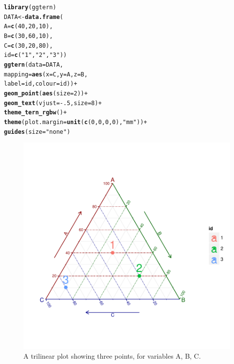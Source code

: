 \documentclass[11pt]{book}\usepackage[]{graphicx}\usepackage[]{color}
\makeatletter
\newcommand{\hlnum}[1]{\textcolor[rgb]{0.686,0.059,0.569}{#1}}%
\newcommand{\hlstr}[1]{\textcolor[rgb]{0.192,0.494,0.8}{#1}}%
\newcommand{\hlopt}[1]{\textcolor[rgb]{0,0,0}{#1}}%
\newcommand{\hlstd}[1]{\textcolor[rgb]{0.345,0.345,0.345}{#1}}%
\newcommand{\hlkwb}[1]{\textcolor[rgb]{0.69,0.353,0.396}{#1}}%
\newcommand{\hlkwc}[1]{\textcolor[rgb]{0.333,0.667,0.333}{#1}}%
\newcommand{\hlkwd}[1]{\textcolor[rgb]{0.737,0.353,0.396}{\textbf{#1}}}%
\newenvironment{kframe}{%
 \def\at@end@of@kframe{}%
 \ifinner\ifhmode%
  \def\at@end@of@kframe{\end{minipage}}%
  \begin{minipage}{\columnwidth}%
 \fi\fi%
 \def\FrameCommand##1{\hskip\@totalleftmargin \hskip-\fboxsep
 \colorbox{shadecolor}{##1}\hskip-\fboxsep
     \hskip-\linewidth \hskip-\@totalleftmargin \hskip\columnwidth}%
 \MakeFramed {\advance\hsize-\width
   \@totalleftmargin\z@ \linewidth\hsize
   \@setminipage}}%
 {\par\unskip\endMakeFramed%
 \at@end@of@kframe}
\newenvironment{knitrout}{}{} %
\renewenvironment{knitrout}{\small\renewcommand{\baselinestretch}{.85}}{} %
\makeatother
\begin{document}
\begin{knitrout}
\color{fgcolor}\begin{kframe}
\begin{alltt}
\hlkwd{library}\hlstd{(ggtern)}
\hlstd{DATA} \hlkwb{<-} \hlkwd{data.frame}\hlstd{(}
  \hlkwc{A} \hlstd{=} \hlkwd{c}\hlstd{(}\hlnum{40}\hlstd{,} \hlnum{20}\hlstd{,} \hlnum{10}\hlstd{),}
  \hlkwc{B} \hlstd{=} \hlkwd{c}\hlstd{(}\hlnum{30}\hlstd{,} \hlnum{60}\hlstd{,} \hlnum{10}\hlstd{),}
  \hlkwc{C} \hlstd{=} \hlkwd{c}\hlstd{(}\hlnum{30}\hlstd{,} \hlnum{20}\hlstd{,} \hlnum{80}\hlstd{),}
  \hlkwc{id} \hlstd{=} \hlkwd{c}\hlstd{(}\hlstr{"1"}\hlstd{,} \hlstr{"2"}\hlstd{,} \hlstr{"3"}\hlstd{))}
\hlkwd{ggtern}\hlstd{(}\hlkwc{data} \hlstd{= DATA,}
       \hlkwc{mapping} \hlstd{=} \hlkwd{aes}\hlstd{(}\hlkwc{x}\hlstd{=C,} \hlkwc{y}\hlstd{=A,} \hlkwc{z}\hlstd{=B,}
                     \hlkwc{label}\hlstd{=id,} \hlkwc{colour}\hlstd{=id))} \hlopt{+}
    \hlkwd{geom_point}\hlstd{(}\hlkwd{aes}\hlstd{(}\hlkwc{size}\hlstd{=}\hlnum{2}\hlstd{))} \hlopt{+}
    \hlkwd{geom_text}\hlstd{(}\hlkwc{vjust}\hlstd{=}\hlopt{-}\hlnum{.5}\hlstd{,} \hlkwc{size}\hlstd{=}\hlnum{8}\hlstd{)} \hlopt{+}
    \hlkwd{theme_tern_rgbw}\hlstd{()} \hlopt{+}
    \hlkwd{theme}\hlstd{(}\hlkwc{plot.margin}\hlstd{=}\hlkwd{unit}\hlstd{(}\hlkwd{c}\hlstd{(}\hlnum{0}\hlstd{,}\hlnum{0}\hlstd{,}\hlnum{0}\hlstd{,}\hlnum{0}\hlstd{),}\hlstr{"mm"}\hlstd{))} \hlopt{+}
    \hlkwd{guides}\hlstd{(}\hlkwc{size} \hlstd{=} \hlstr{"none"}\hlstd{)}
\end{alltt}
\end{kframe}\begin{figure}[htbp]


\centerline{\includegraphics[width=.6\textwidth,trim=20 20 20 20,clip]{ch04/fig/tripdemo2} }

\caption[A trilinear plot showing three points, for variables A, B, C]{A trilinear plot showing three points, for variables A, B, C.\label{fig:tripdemo2}}
\end{figure}


\end{knitrout}
\end{document}
